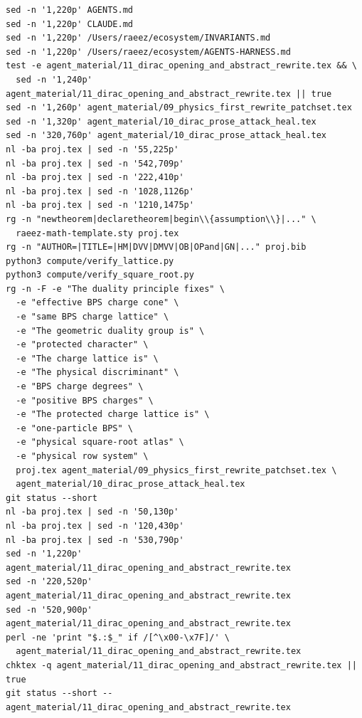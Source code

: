 \begin{verbatim}
sed -n '1,220p' AGENTS.md
sed -n '1,220p' CLAUDE.md
sed -n '1,220p' /Users/raeez/ecosystem/INVARIANTS.md
sed -n '1,220p' /Users/raeez/ecosystem/AGENTS-HARNESS.md
test -e agent_material/11_dirac_opening_and_abstract_rewrite.tex && \
  sed -n '1,240p' agent_material/11_dirac_opening_and_abstract_rewrite.tex || true
sed -n '1,260p' agent_material/09_physics_first_rewrite_patchset.tex
sed -n '1,320p' agent_material/10_dirac_prose_attack_heal.tex
sed -n '320,760p' agent_material/10_dirac_prose_attack_heal.tex
nl -ba proj.tex | sed -n '55,225p'
nl -ba proj.tex | sed -n '542,709p'
nl -ba proj.tex | sed -n '222,410p'
nl -ba proj.tex | sed -n '1028,1126p'
nl -ba proj.tex | sed -n '1210,1475p'
rg -n "newtheorem|declaretheorem|begin\\{assumption\\}|..." \
  raeez-math-template.sty proj.tex
rg -n "AUTHOR=|TITLE=|HM|DVV|DMVV|OB|OPand|GN|..." proj.bib
python3 compute/verify_lattice.py
python3 compute/verify_square_root.py
rg -n -F -e "The duality principle fixes" \
  -e "effective BPS charge cone" \
  -e "same BPS charge lattice" \
  -e "The geometric duality group is" \
  -e "protected character" \
  -e "The charge lattice is" \
  -e "The physical discriminant" \
  -e "BPS charge degrees" \
  -e "positive BPS charges" \
  -e "The protected charge lattice is" \
  -e "one-particle BPS" \
  -e "physical square-root atlas" \
  -e "physical row system" \
  proj.tex agent_material/09_physics_first_rewrite_patchset.tex \
  agent_material/10_dirac_prose_attack_heal.tex
git status --short
nl -ba proj.tex | sed -n '50,130p'
nl -ba proj.tex | sed -n '120,430p'
nl -ba proj.tex | sed -n '530,790p'
sed -n '1,220p' agent_material/11_dirac_opening_and_abstract_rewrite.tex
sed -n '220,520p' agent_material/11_dirac_opening_and_abstract_rewrite.tex
sed -n '520,900p' agent_material/11_dirac_opening_and_abstract_rewrite.tex
perl -ne 'print "$.:$_" if /[^\x00-\x7F]/' \
  agent_material/11_dirac_opening_and_abstract_rewrite.tex
chktex -q agent_material/11_dirac_opening_and_abstract_rewrite.tex || true
git status --short -- agent_material/11_dirac_opening_and_abstract_rewrite.tex
\end{verbatim}
